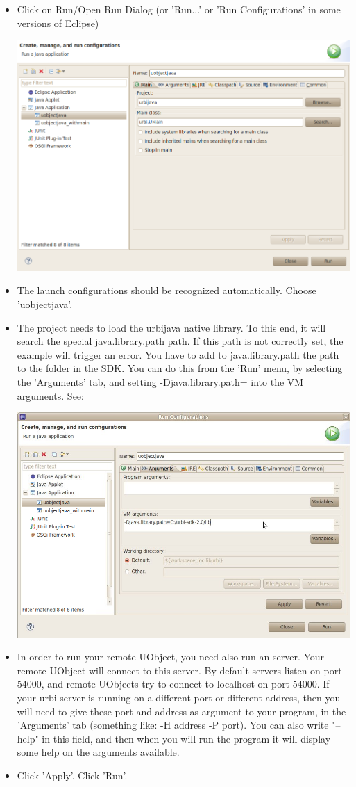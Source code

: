 \begin{itemize}
\item Click on Run/Open Run Dialog (or 'Run...' or 'Run Configurations' in
  some versions of Eclipse)

\begin{center}
  \includegraphics[width=0.6\linewidth]{img/run-uobjectjava}
\end{center}

\item The launch configurations should be recognized automatically. Choose 'uobjectjava'.

\item The project needs to load the urbijava native library. To this end, it will search the special
java.library.path path. If this path is not correctly set, the example will trigger an error.
You have to add to java.library.path the path to the  folder in the \urbi SDK. You can do
this from the 'Run' menu, by selecting the 'Arguments' tab, and setting -Djava.library.path=
into the VM arguments. See:

\begin{center}
  \includegraphics[width=0.6\linewidth]{img/set_javalibrarypath}
\end{center}

\item In order to run your remote UObject, you need also run an \urbi server. Your remote UObject
will connect to this \urbi server. By default \urbi servers listen on port 54000, and remote UObjects
try to connect to localhost on port 54000. If your urbi server is running on a different port or different
address, then you will need to give these port and address as argument to your program, in the 'Arguments'
tab (something like: -H address -P port). You can also write "--help" in this field, and then when you will
run the program it will display some help on the arguments available.

\item Click 'Apply'. Click 'Run'.

\end{itemize}


